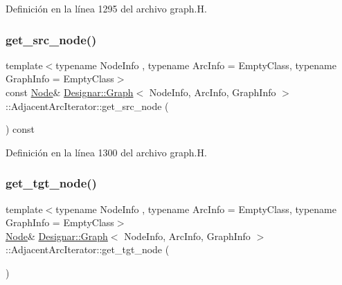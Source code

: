 Definición en la línea 1295 del archivo graph.\+H.

\mbox{\label{class_designar_1_1_graph_1_1_adjacent_arc_iterator_ae4ba07319b439cc08df6c957a61bc224}} 
\subsubsection{\texorpdfstring{get\+\_\+src\+\_\+node()}{get\_src\_node()}\hspace{0.1cm}{\footnotesize\ttfamily [2/2]}}
{\footnotesize\ttfamily template$<$typename Node\+Info , typename Arc\+Info  = Empty\+Class, typename Graph\+Info  = Empty\+Class$>$ \\
const \hyperlink{class_designar_1_1_graph_a5dfc7dba9d092ac489c72e40390c37d0}{Node}\& \hyperlink{class_designar_1_1_graph}{Designar\+::\+Graph}$<$ Node\+Info, Arc\+Info, Graph\+Info $>$\+::Adjacent\+Arc\+Iterator\+::get\+\_\+src\+\_\+node (\begin{DoxyParamCaption}{ }\end{DoxyParamCaption}) const\hspace{0.3cm}{\ttfamily [inline]}}



Definición en la línea 1300 del archivo graph.\+H.

\mbox{\label{class_designar_1_1_graph_1_1_adjacent_arc_iterator_a400e7399fa39eb49e64afcd2d0b26ff6}} 
\subsubsection{\texorpdfstring{get\+\_\+tgt\+\_\+node()}{get\_tgt\_node()}\hspace{0.1cm}{\footnotesize\ttfamily [1/2]}}
{\footnotesize\ttfamily template$<$typename Node\+Info , typename Arc\+Info  = Empty\+Class, typename Graph\+Info  = Empty\+Class$>$ \\
\hyperlink{class_designar_1_1_graph_a5dfc7dba9d092ac489c72e40390c37d0}{Node}\& \hyperlink{class_designar_1_1_graph}{Designar\+::\+Graph}$<$ Node\+Info, Arc\+Info, Graph\+Info $>$\+::Adjacent\+Arc\+Iterator\+::get\+\_\+tgt\+\_\+node (\begin{DoxyParamCaption}{ }\end{DoxyParamCaption})\hspace{0.3cm}{\ttfamily [inline]}}




